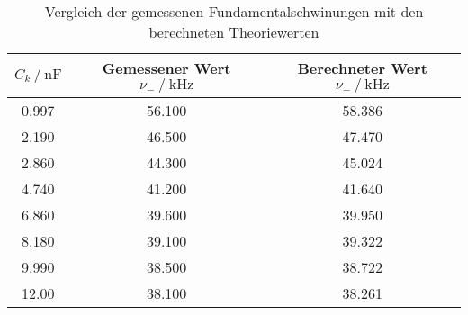 \begin{table}
  \centering
  \caption{Vergleich der gemessenen Fundamentalschwinungen mit den berechneten Theoriewerten}
  \label{tab:schwingung}
  \begin{tabular}{c c c}
    \toprule 
    $C_k \:/\: \si{\nano\farad}$ & Gemessener Wert $\nu _- \:/\: \si{\kilo\hertz}$ & Berechneter Wert $\nu _- \:/\: \si{\kilo\hertz}$    \\ 
    \midrule 
    0.997 & 56.100 & 58.386 \\
    2.190 & 46.500 & 47.470 \\
    2.860 & 44.300 & 45.024 \\
    4.740 & 41.200 & 41.640 \\
    6.860 & 39.600 & 39.950 \\
    8.180 & 39.100 & 39.322 \\
    9.990 & 38.500 & 38.722 \\
    12.00 & 38.100 & 38.261 \\
    \bottomrule
  \end{tabular}
\end{table}



